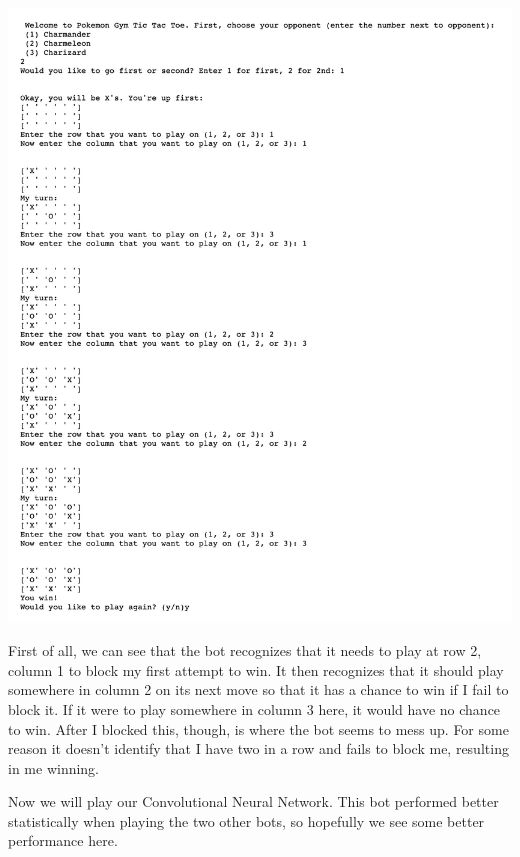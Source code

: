 \includegraphics[scale=.3]{model_2}

First of all, we can see that the bot recognizes that it needs to play at row 2, column 1 to block my first attempt to win. It then recognizes that it should play somewhere in column 2 on its next move so that it has a chance to win if I fail to block it. If it were to play somewhere in column 3 here, it would have no chance to win. After I blocked this, though, is where the bot seems to mess up. For some reason it doesn't identify that I have two in a row and fails to block me, resulting in me winning.


Now we will play our Convolutional Neural Network. This bot performed better statistically when playing the two other bots, so hopefully we see some better performance here. 

